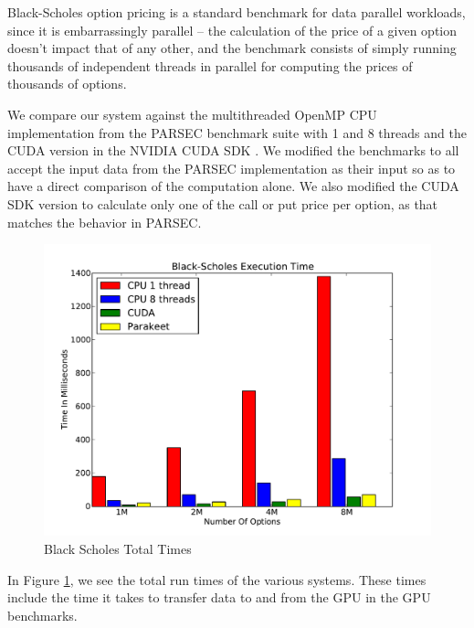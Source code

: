 \documentclass[preprint]{sigplanconf}
\begin{document}
Black-Scholes option pricing \cite{Blac73} is a standard benchmark for data parallel workloads, since it is embarrassingly parallel -- the calculation of the price of a given option doesn't impact that of any other, and the benchmark consists of simply running thousands of independent threads in parallel for computing the prices of thousands of options.

We compare our system against the multithreaded OpenMP CPU implementation from the PARSEC \cite{Bien08} benchmark suite with 1 and 8 threads and the CUDA version in the NVIDIA CUDA SDK \cite{NvidSD}.  We modified the benchmarks to all accept the input data from the PARSEC implementation as their input so as to have a direct comparison of the computation alone.  We also modified the CUDA SDK version to calculate only one of the call or put price per option, as that matches the behavior in PARSEC.

\begin{figure}
\includegraphics[scale=0.45]{BSWCPU.pdf}
\caption{Black Scholes Total Times}
\label{BSCPU}
\end{figure}

In Figure \ref{BSCPU}, we see the total run times of the various systems. These times include the time it takes to transfer data to and from the GPU in the GPU benchmarks.
\end{document}
